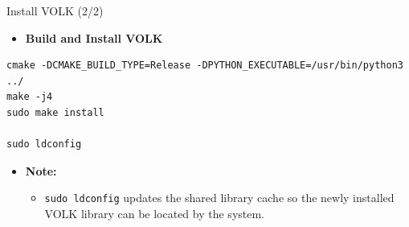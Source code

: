 \begin{frame}[fragile]{Install VOLK (2/2)}

\footnotesize
\vspace{-1.8cm}
\begin{itemize}
    \item \textbf{Build and Install VOLK}
\end{itemize}

\scriptsize

\begin{Verbatim}[xleftmargin=2.8em,breaklines,breaksymbolleft={},breaksymbolright={},breakanywhere]
cmake -DCMAKE_BUILD_TYPE=Release -DPYTHON_EXECUTABLE=/usr/bin/python3 ../
make -j4
sudo make install

sudo ldconfig
\end{Verbatim}

\footnotesize
\vspace{0.5cm}
\begin{itemize}
    \item \textbf{Note:}
    \begin{itemize}
        \item \texttt{sudo ldconfig} updates the shared library cache so the
        newly installed VOLK library can be located by the system.
    \end{itemize}
\end{itemize}

\end{frame}
